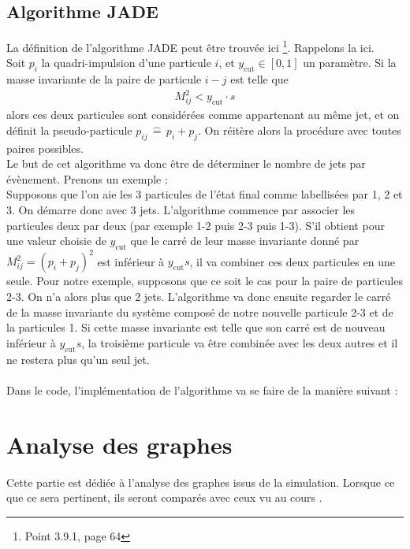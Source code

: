 \documentclass[a4paper]{article} %
\numberwithin{equation}{section} %
\theoremstyle{definition}
\theoremstyle{remark}
\theoremstyle{plain}%
\theoremstyle{style_exemple}
\newcommand\eqdef{\, \widehat{=} \, }
\begin{document}
\subsection{Algorithme JADE}
La définition de l'algorithme JADE peut être trouvée ici \cite{Cours-QCD}\footnote{Point 3.9.1, page 64}. Rappelons la ici.\\
Soit $p_i$ la quadri-impulsion d'une particule $i$, et $y_\text{cut} \in [0, 1]$ un paramètre. Si la masse invariante de la paire de particule $i-j$ est telle que
\begin{align*}
    M_{ij}^2 < y_\text{cut} \cdot s
\end{align*}
alors ces deux particules sont considérées comme appartenant au même jet, et on définit la pseudo-particule $p_{ij} \eqdef p_i + p_j$. On réitère alors la procédure avec toutes paires possibles.\\
Le but de cet algorithme va donc être de déterminer le nombre de jets par évènement. Prenons un exemple :\\
Supposons que l'on aie les 3 particules de l'état final comme labellisées par 1, 2 et 3. On démarre donc avec 3 jets. L'algorithme commence par associer les particules deux par deux (par exemple 1-2 puis 2-3 puis 1-3). S'il obtient pour une valeur choisie de $y_\text{cut}$ que le carré de leur masse invariante donné par $M^2_{ij} = (p_i+p_j)^2$ est inférieur à $y_\text{cut}s$, il va combiner ces deux particules en une seule. Pour notre exemple, supposons que ce soit le cas pour la paire de particules 2-3. On n'a alors plus que 2 jets. L'algorithme va donc ensuite regarder le carré de la masse invariante du système composé de notre nouvelle particule 2-3 et de la particules 1. Si cette masse invariante est telle que son carré est de nouveau inférieur à $y_\text{cut}s$, la troisième particule va être combinée avec les deux autres et il ne restera plus qu'un seul jet.\\
\\
Dans le code, l'implémentation de l'algorithme va se faire de la manière suivant :


\newpage
\section{Analyse des graphes}
Cette partie est dédiée à l'analyse des graphes issus de la simulation. Lorsque ce que ce sera pertinent, ils seront comparés avec ceux vu au cours \cite{Cours-QCD}.
\end{document}
